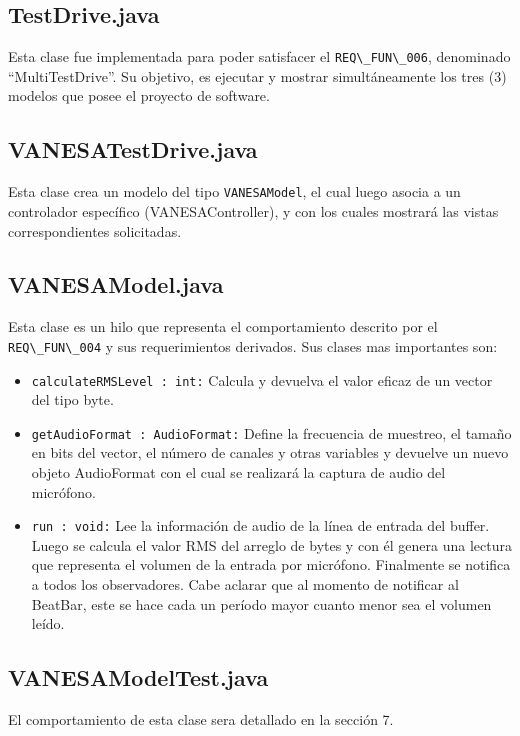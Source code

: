 \documentclass[10pt]{article} %
\newcommand{\comillas}[1]{``#1''}
\begin{document}
\subsection{TestDrive.java}
Esta clase fue implementada para poder satisfacer el \verb+REQ\_FUN\_006+, denominado \comillas{MultiTestDrive}. Su objetivo, es ejecutar y mostrar simultáneamente los tres (3) modelos que posee el proyecto de software.

\subsection{VANESATestDrive.java}
Esta clase crea un modelo del tipo \verb+VANESAModel+, el cual luego asocia a un controlador específico (VANESAController), y con los cuales mostrará las vistas correspondientes solicitadas.

\subsection{VANESAModel.java}
Esta clase es un hilo que representa el comportamiento descrito por el \verb+REQ\_FUN\_004+ y sus requerimientos derivados. Sus clases mas importantes son:
\begin{itemize}
\item \verb+calculateRMSLevel : int:+ Calcula y devuelva el valor eficaz de un vector del tipo byte.
\item \verb+getAudioFormat : AudioFormat:+ Define la frecuencia de muestreo, el tamaño en bits del vector, el número de canales y otras variables y devuelve un nuevo objeto AudioFormat con el cual se realizará la captura de audio del micrófono.
\item \verb+run : void:+ Lee la información de audio de la línea de entrada del buffer. Luego se calcula el valor RMS del arreglo de bytes y con él genera una lectura que representa el volumen de la entrada por micrófono. Finalmente se notifica a todos los observadores. Cabe aclarar que al momento de notificar al BeatBar, este se hace cada un período mayor cuanto menor sea el volumen leído.
\end{itemize}

\subsection{VANESAModelTest.java}
El comportamiento de esta clase sera detallado en la sección 7. %
\end{document}
